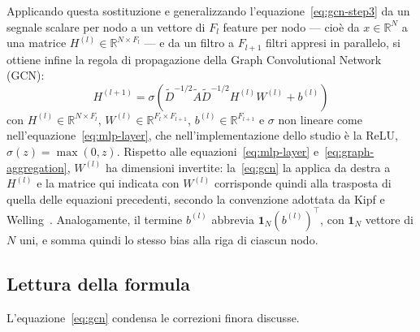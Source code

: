 Applicando questa sostituzione e generalizzando l'equazione~\eqref{eq:gcn-step3} da un segnale scalare per nodo a un vettore di $F_l$ feature per nodo — cioè da $x\in\mathbb{R}^N$ a una matrice $H^{(l)}\in\mathbb{R}^{N\times F_l}$ — e da un filtro a $F_{l+1}$ filtri appresi in parallelo, si ottiene infine la regola di propagazione della Graph Convolutional Network (GCN):
\begin{equation}
\label{eq:gcn}
\boxed{\;H^{(l+1)} = \sigma\!\left(\tilde D^{-1/2}\tilde A\tilde D^{-1/2}H^{(l)}W^{(l)} + b^{(l)}\right)\;}
\end{equation}
con $H^{(l)}\in\mathbb{R}^{N\times F_l}$, $W^{(l)}\in\mathbb{R}^{F_l\times F_{l+1}}$, $b^{(l)}\in\mathbb{R}^{F_{l+1}}$ e $\sigma$ non lineare come nell'equazione~\eqref{eq:mlp-layer}, che nell'implementazione dello studio è la ReLU, $\sigma(z)=\max(0,z)$. Rispetto alle equazioni~\eqref{eq:mlp-layer} e~\eqref{eq:graph-aggregation}, $W^{(l)}$ ha dimensioni invertite: la~\eqref{eq:gcn} la applica da destra a $H^{(l)}$ e la matrice qui indicata con $W^{(l)}$ corrisponde quindi alla trasposta di quella delle equazioni precedenti, secondo la convenzione adottata da Kipf e Welling~\cite{kipf2017gcn}. Analogamente, il termine $b^{(l)}$ abbrevia $\mathbf{1}_N(b^{(l)})^\top$, con $\mathbf{1}_N$ vettore di $N$ uni, e somma quindi lo stesso bias alla riga di ciascun nodo.

\subsection{Lettura della formula}

L'equazione~\eqref{eq:gcn} condensa le correzioni finora discusse.

